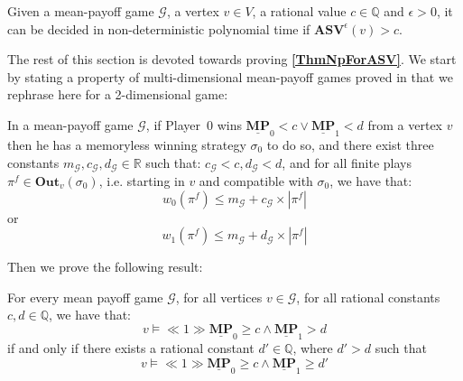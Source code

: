 \begin{theorem}
    \label{ThmNpForASV}
    Given a mean-payoff game $\mathcal{G}$, a vertex $v \in V$, a rational value $c \in \mathbb{Q}$ and $\epsilon > 0$, it can be decided in non-deterministic polynomial time if $\mathbf{ASV}^{\epsilon}(v) > c$.
\end{theorem}

\noindent The rest of this section is devoted towards proving \textbf{\cref{ThmNpForASV}}. We start by stating a property of multi-dimensional mean-payoff games proved in \cite{VCDHRR15} that we rephrase here for a 2-dimensional game:

\begin{lemma}
    \label{LemWeightPlayGrtThanC}
    In a mean-payoff game $\mathcal{G}$, if Player~0 wins $\underline{\mathbf{MP}}_0 < c \lor \underline{\mathbf{MP}}_1 < d$ from a vertex $v$ then he has a memoryless winning strategy $\sigma_0$ to do so, and there exist three constants $m_\mathcal{G}, c_\mathcal{G}, d_\mathcal{G} \in \mathbb{R}$ such that: $c_\mathcal{G} < c, d_\mathcal{G} < d$, and for all finite plays $\pi^f \in \mathbf{Out}_v(\sigma_0)$, i.e. starting in $v$ and compatible with $\sigma_0$, we have that:
    \begin{equation*}
        w_0(\pi^f) \leqslant m_\mathcal{G} + c_\mathcal{G} \times |\pi^f|
    \end{equation*}
    or
    \begin{equation*}
        w_1(\pi^f) \leqslant m_\mathcal{G} + d_\mathcal{G} \times |\pi^f|
    \end{equation*}
\end{lemma}

\noindent Then we prove the following result:

\begin{lemma}
    \label{ConjGrtIsGrtEq}
    For every mean payoff game $\mathcal{G}$, for all vertices $v \in \mathcal{G}$, for all rational constants $c, d \in \mathbb{Q}$, we have that:
    \begin{equation*}
        v \models \ll 1 \gg \underline{\mathbf{MP}}_0 \geqslant c \land \underline{\mathbf{MP}}_1 > d
    \end{equation*}
    if and only if there exists a rational constant $d' \in \mathbb{Q}$, where $d' > d$ such that
    \begin{equation*}
        v \models \ll 1 \gg \underline{\mathbf{MP}}_0 \geqslant c \land \underline{\mathbf{MP}}_1 \geqslant d'
    \end{equation*}
\end{lemma}

